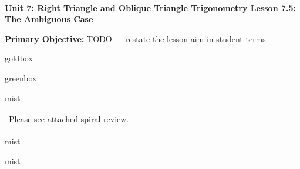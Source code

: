 \documentclass[10pt]{article}
\newcommand{\UnitNumberName}{Unit 7: Right Triangle and Oblique Triangle Trigonometry \quad}
\newcommand{\LessonNumberName}{Lesson 7.5: The Ambiguous Case}
\begin{document}
\begin{center}
    {\Large\bfseries \CourseName \\
    {\small\bfseries \UnitNumberName \LessonNumberName}}
\end{center}

\begin{tcolorbox}[colback=mist, colframe=royal, boxrule=0.9pt, arc=2mm,
    left=2mm, right=2mm, top=1.5mm, bottom=1.5mm]
    \textbf{Primary Objective:} TODO --- restate the lesson aim in student terms
\end{tcolorbox}

\renewcommand{\arraystretch}{1.6}
\begin{skillbox}{goldbox}
\end{skillbox}

\begin{skillbox}{greenbox}
\end{skillbox}

\begin{fixedskillbox}{mist}
    \begin{tabularx}{\linewidth}{@{}X c@{}}
        \begin{minipage}[t]{0.55\linewidth}\vspace{0pt}
            Please see attached spiral review.  %
        \end{minipage}
        &
        \begin{minipage}[t]{0.38\linewidth}\vspace{0pt}\centering
        \end{minipage}
    \end{tabularx}
\end{fixedskillbox}

\begin{skillbox}[Hook]{mist}
\end{skillbox}

\begin{skillbox}[Lesson]{mist}
\end{skillbox}
\end{document}
